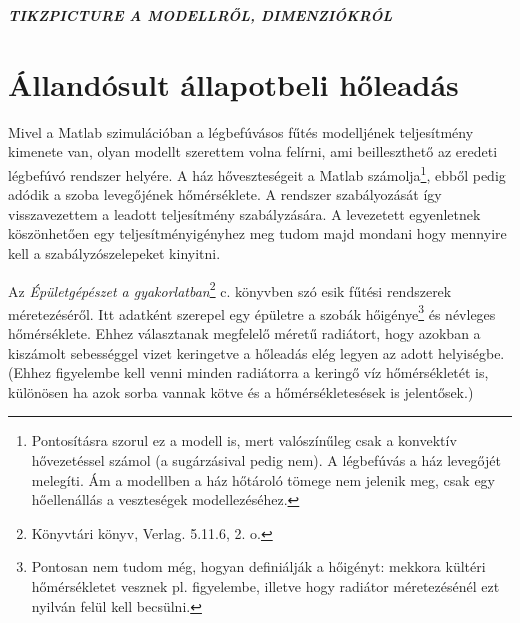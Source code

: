 \textbf{\textit{TIKZPICTURE A MODELLRŐL, DIMENZIÓKRÓL}}

\section{Állandósult állapotbeli hőleadás}



\begin{formal}
Mivel a Matlab szimulációban a légbefúvásos fűtés modelljének teljesítmény kimenete van, olyan modellt szerettem volna felírni, ami beilleszthető az eredeti légbefúvó rendszer helyére. A ház hőveszteségeit a Matlab számolja\footnote{Pontosításra szorul ez a modell is, mert valószínűleg csak a konvektív hővezetéssel számol (a sugárzásival pedig nem). A légbefúvás a ház levegőjét melegíti. Ám a modellben a ház hőtároló tömege nem jelenik meg, csak egy hőellenállás a veszteségek modellezéséhez.}, ebből pedig adódik a szoba levegőjének hőmérséklete. A rendszer szabályozását így visszavezettem a leadott teljesítmény szabályzására. A levezetett egyenletnek köszönhetően egy teljesítményigényhez meg tudom majd mondani hogy mennyire kell a szabályzószelepeket kinyitni.


Az \textit{Épületgépészet a gyakorlatban}\footnote{Könyvtári könyv, Verlag. 5.11.6, 2. o.} c. könyvben szó esik fűtési rendszerek méretezéséről. Itt adatként szerepel egy épületre a szobák hőigénye\footnote{Pontosan nem tudom még, hogyan definiálják a hőigényt: mekkora kültéri hőmérsékletet vesznek pl. figyelembe, illetve hogy radiátor méretezésénél ezt nyilván felül kell becsülni.} és névleges hőmérséklete. Ehhez választanak megfelelő méretű radiátort, hogy azokban a kiszámolt sebességgel vizet keringetve a hőleadás elég legyen az adott helyiségbe.
{\scriptsize(Ehhez figyelembe kell venni minden radiátorra a keringő víz hőmérsékletét is, különösen ha azok sorba vannak kötve és a hőmérsékletesések is jelentősek.)}



\end{formal}
